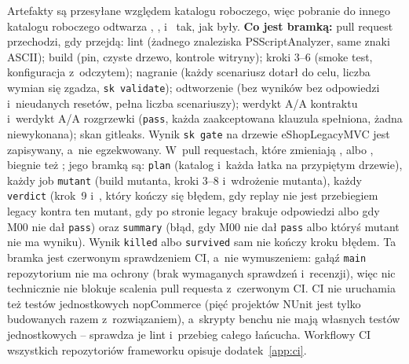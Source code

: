 Artefakty są przesyłane względem katalogu roboczego, więc pobranie do innego katalogu
roboczego odtwarza , ,  i~ tak,
jak były. \textbf{Co jest bramką:} pull request przechodzi, gdy przejdą: lint (żadnego
znaleziska PSScriptAnalyzer, same znaki ASCII); build (pin, czyste drzewo, kontrole
witryny); kroki 3--6 (smoke test, konfiguracja z~odczytem); nagranie (każdy scenariusz
dotarł do celu, liczba wymian się zgadza, \texttt{sk validate}); odtworzenie (bez wyników
bez odpowiedzi i~nieudanych resetów, pełna liczba scenariuszy); werdykt A/A kontraktu
i~werdykt A/A rozgrzewki (\texttt{pass}, każda zaakceptowana klauzula spełniona, żadna
niewykonana); skan gitleaks. Wynik \texttt{sk gate} na drzewie eShopLegacyMVC jest
zapisywany, a~nie egzekwowany. W~pull requestach, które zmieniają ,
 albo , biegnie też ; jego bramką
są: \texttt{plan} (katalog i~każda łatka na przypiętym drzewie), każdy job \texttt{mutant}
(build mutanta, kroki 3--8 i~wdrożenie mutanta), każdy \texttt{verdict} (krok~9
i~, który kończy się błędem, gdy replay nie jest przebiegiem
legacy kontra ten mutant, gdy po stronie legacy brakuje odpowiedzi albo gdy M00 nie dał
\texttt{pass}) oraz \texttt{summary} (błąd, gdy M00 nie dał \texttt{pass} albo któryś mutant
nie ma wyniku). Wynik \texttt{killed} albo \texttt{survived} sam nie kończy kroku błędem.
Ta bramka jest czerwonym sprawdzeniem CI, a~nie wymuszeniem: gałąź \texttt{main} repozytorium
nie ma ochrony (brak wymaganych sprawdzeń i~recenzji), więc nic technicznie nie blokuje
scalenia pull requesta z~czerwonym CI. CI nie uruchamia też testów jednostkowych
nopCommerce (pięć projektów NUnit jest tylko budowanych razem z~rozwiązaniem), a~skrypty
benchu nie mają własnych testów jednostkowych -- sprawdza je lint i~przebieg całego łańcucha.
Workflowy CI wszystkich repozytoriów frameworku opisuje dodatek~\ref{app:ci}.


